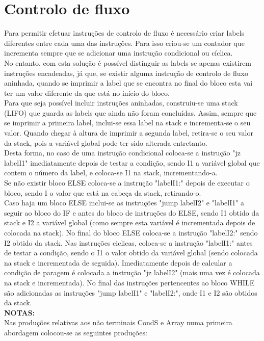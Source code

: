 \documentclass{report}
\begin{document}
\section{Controlo de fluxo}
Para permitir efetuar instruções de controlo de fluxo é necessário criar labels diferentes entre cada uma das instruções. Para isso criou-se um contador que incrementa sempre que se adicionar uma instrução condicional ou cíclica.\\
No entanto, com esta solução é possível distinguir as labels se apenas existirem instruções encadeadas, já que, se existir alguma instrução de controlo de fluxo aninhada, quando se imprimir a label que se encontra no final do bloco esta vai ter um valor diferente da que está no início do bloco.\\
Para que seja possível incluir instruções aninhadas, construiu-se uma stack (LIFO) que guarda as labels que ainda não foram concluídas. Assim, sempre que se imprimir a primeira label, inclui-se essa label na stack e incrementa-se o seu valor. Quando chegar à altura de imprimir a segunda label, retira-se o seu valor da stack, pois a variável global pode ter sido alterada entretanto.\\
Desta forma, no caso de uma instrução condicional coloca-se a instrução "jz labelI1" imediatamente depois de testar a condição, sendo I1 a variável global que contem o número da label, e coloca-se I1 na stack, incrementando-a.\\
Se não existir bloco ELSE coloca-se a instrução "labelI1:" depois de executar o bloco, sendo I o valor que está na cabeça da stack, retirando-o.\\
Caso haja um bloco ELSE inclui-se as instruções "jump labelI2" e "labelI1" a seguir ao bloco do IF e antes do bloco de instruções do ELSE, sendo I1 obtido da stack e I2 a variável global (como sempre esta variável é incrementada depois de colocada na stack). No final do bloco ELSE coloca-se a instrução "labelI2:" sendo I2 obtido da stack.
Nas instruções ciclicas, coloca-se a instrução "labelI1:" antes de testar a condição, sendo o I1 o valor obtido da variável global (sendo colocada na stack e incrementada de seguida). Imediatamente depois de calcular a condição de paragem é colocada a instrução "jz labelI2" (mais uma vez é colocada na stack e incrementada). No final das instruções pertencentes ao bloco WHILE são adicionadas as instruções "jump labelI1" e "labelI2:", onde I1 e I2 são obtidos da stack.
\\ 
\textbf{NOTAS:}\\
Nas produções relativas aos não terminais CondS e Array numa primeira abordagem colocou-se as seguintes produções:
\end{document}
